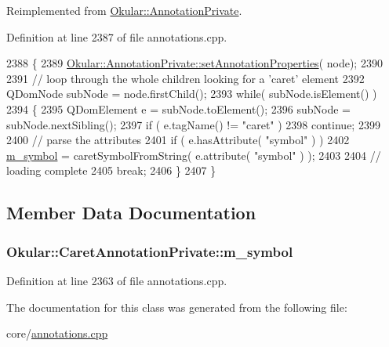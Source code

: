 Reimplemented from \hyperlink{classOkular_1_1AnnotationPrivate_a5fc7b450fa8c7e2717372e7394c3aa39}{Okular\+::\+Annotation\+Private}.



Definition at line 2387 of file annotations.\+cpp.


\begin{DoxyCode}
2388 \{
2389     \hyperlink{classOkular_1_1AnnotationPrivate_a5fc7b450fa8c7e2717372e7394c3aa39}{Okular::AnnotationPrivate::setAnnotationProperties}(
      node);
2390 
2391     \textcolor{comment}{// loop through the whole children looking for a 'caret' element}
2392     QDomNode subNode = node.firstChild();
2393     \textcolor{keywordflow}{while}( subNode.isElement() )
2394     \{
2395         QDomElement e = subNode.toElement();
2396         subNode = subNode.nextSibling();
2397         \textcolor{keywordflow}{if} ( e.tagName() != \textcolor{stringliteral}{"caret"} )
2398             \textcolor{keywordflow}{continue};
2399 
2400         \textcolor{comment}{// parse the attributes}
2401         \textcolor{keywordflow}{if} ( e.hasAttribute( \textcolor{stringliteral}{"symbol"} ) )
2402             \hyperlink{classOkular_1_1CaretAnnotationPrivate_ae93f5592157c6c38ceb239b5b1c31aae}{m\_symbol} = caretSymbolFromString( e.attribute( \textcolor{stringliteral}{"symbol"} ) );
2403 
2404         \textcolor{comment}{// loading complete}
2405         \textcolor{keywordflow}{break};
2406     \}
2407 \}
\end{DoxyCode}


\subsection{Member Data Documentation}
\hypertarget{classOkular_1_1CaretAnnotationPrivate_ae93f5592157c6c38ceb239b5b1c31aae}{
\subsubsection[{m\+\_\+symbol}]{ Okular\+::\+Caret\+Annotation\+Private\+::m\+\_\+symbol}}\label{classOkular_1_1CaretAnnotationPrivate_ae93f5592157c6c38ceb239b5b1c31aae}


Definition at line 2363 of file annotations.\+cpp.



The documentation for this class was generated from the following file\+:\begin{DoxyCompactItemize}
\item 
core/\hyperlink{annotations_8cpp}{annotations.\+cpp}\end{DoxyCompactItemize}
